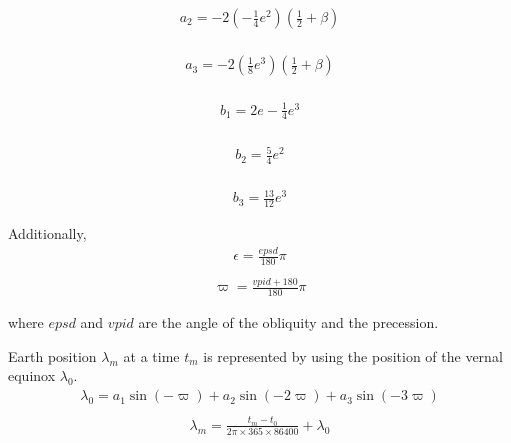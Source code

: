 \begin{equation}
\begin{array}{l}
a_{2}=-2\left(-\frac{1}{4} e^{2}\right)\left(\frac{1}{2}+\beta\right) \\
\end{array}
\end{equation}

\begin{equation}
\begin{array}{l}
a_{3}=-2\left(\frac{1}{8} e^{3}\right)\left(\frac{1}{2}+\beta\right) \\
\end{array}
\end{equation}

\begin{equation}
\begin{array}{l}
b_{1}=2 e-\frac{1}{4} e^{3} \\
\end{array}
\end{equation}

\begin{equation}
\begin{array}{l}
b_{2}=\frac{5}{4} e^{2} \\
\end{array}
\end{equation}

\begin{equation}
\begin{array}{l}
b_{3}=\frac{13}{12} e^{3}
\end{array}
\end{equation}

Additionally, \begin{equation}
\begin{array}{l}
\epsilon=\frac{e p s d}{180} \pi \\
\end{array}
\end{equation} \begin{equation}
\begin{array}{l}
\varpi=\frac{v p i d+180}{180} \pi
\end{array}
\end{equation}

where \(epsd\) and \(vpid\) are the angle of the obliquity and the
precession.

Earth position \(\lambda_{m}\) at a time \(t_m\) is represented by using
the position of the vernal equinox \(\lambda_{0}\). \begin{equation}
\begin{array}{c}
\lambda_{0}=a_{1} \sin (-\varpi)+a_{2} \sin (-2 \varpi)+a_{3} \sin (-3 \varpi) \\
\end{array}
\end{equation} \begin{equation}
\begin{array}{c}
\lambda_{m}=\frac{t_{m}-t_{0}}{2 \pi \times 365 \times 86400}+\lambda_{0}
\end{array}
\end{equation}

